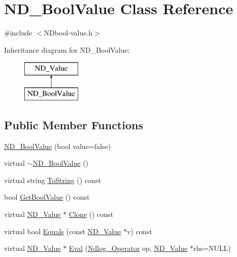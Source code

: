 \hypertarget{class_n_d___bool_value}{\section{N\-D\-\_\-\-Bool\-Value Class Reference}
\label{class_n_d___bool_value}
}


{\ttfamily \#include $<$N\-Dbool-\/value.\-h$>$}

Inheritance diagram for N\-D\-\_\-\-Bool\-Value\-:\begin{figure}[H]
\begin{center}
\leavevmode
\includegraphics[height=2.000000cm]{class_n_d___bool_value}
\end{center}
\end{figure}
\subsection*{Public Member Functions}
\begin{DoxyCompactItemize}
\item 
\hyperlink{class_n_d___bool_value_a525308592f1e95d053f3163135bd70bb}{N\-D\-\_\-\-Bool\-Value} (bool value=false)
\item 
virtual \hyperlink{class_n_d___bool_value_a3e150405a025a6c7edda82235d192b75}{$\sim$\-N\-D\-\_\-\-Bool\-Value} ()
\item 
virtual string \hyperlink{class_n_d___bool_value_af71a39b64021f7e48a1b91752409302b}{To\-String} () const 
\item 
bool \hyperlink{class_n_d___bool_value_af27d87510c0dabd6991c5601f044db85}{Get\-Bool\-Value} () const 
\item 
virtual \hyperlink{class_n_d___value}{N\-D\-\_\-\-Value} $\ast$ \hyperlink{class_n_d___bool_value_a26fb17aea42dc9d9edf52a783988e4cd}{Clone} () const 
\item 
virtual bool \hyperlink{class_n_d___bool_value_ab4bc7add32f7de0628eaf8ab2dbd1df6}{Equals} (const \hyperlink{class_n_d___value}{N\-D\-\_\-\-Value} $\ast$v) const 
\item 
virtual \hyperlink{class_n_d___value}{N\-D\-\_\-\-Value} $\ast$ \hyperlink{class_n_d___bool_value_af9abb536e2843bb842ba99ce3c6bcd78}{Eval} (\hyperlink{_n_dvalue_8h_afc938fb729c95de25b4d2eb18640b303}{Ndlog\-\_\-\-Operator} op, \hyperlink{class_n_d___value}{N\-D\-\_\-\-Value} $\ast$rhs=N\-U\-L\-L)
\end{DoxyCompactItemize}
